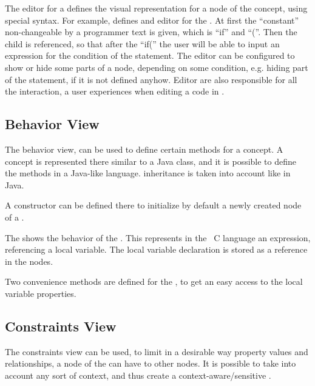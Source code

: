 
The editor for a  defines the visual representation for a node of the concept, using special syntax. For example,  defines
and editor for the . At first the ``constant'' non-changeable by a programmer text is given, which is ``if'' and ``(''. Then
the child  is referenced, so that after the ``if('' the user will be able to input an expression for the condition of the  statement.
The editor can be configured to show or hide some parts of a node, depending on some condition, e.g. hiding  part of the  statement, if it 
is not defined anyhow. Editor are also responsible for all the interaction, a user experiences when editing a code in \jbmps.

\subsection{Behavior View}
The behavior view, can be used to define certain methods for a concept. A concept is represented there similar to a Java class, and
it is possible to define the methods in a Java-like language.  inheritance is taken into account like in Java. 

A  constructor can be defined there to initialize by default a newly created node of a .


The  shows the behavior of the  . This  represents in the
\mbp\ C language an expression, referencing a local variable. The local variable declaration is stored as a reference 
in the  nodes.

Two convenience methods are defined for the  , to get an easy access to the local variable properties.


\subsection{Constraints View}
\label{mpsconstraints}

The constraints view can be used, to limit in a desirable way  property values and relationships, a node of the  can 
have to other nodes. It is possible to take into account any sort of context, and thus create a context-aware/sensitive .

